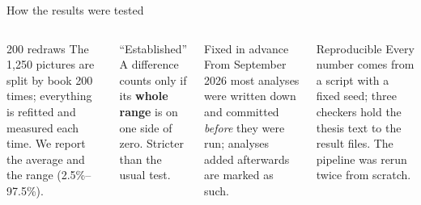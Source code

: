 \documentclass[aspectratio=169,10pt]{beamer}
\begin{document}
\begin{frame}{How the results were tested}
\begin{columns}[T,onlytextwidth]
\begin{defbox}{200 redraws}
The 1,250 pictures are split by book 200 times; everything is refitted and measured each time. We report the average and the range (2.5\%--97.5\%).
\end{defbox}\vspace{3pt}
\begin{defbox}{``Established''}
A difference counts only if its \textbf{whole range} is on one side of zero. Stricter than the usual test.
\end{defbox}
\begin{defbox}{Fixed in advance}
From September 2026 most analyses were written down and committed \emph{before} they were run; analyses added afterwards are marked as such.
\end{defbox}\vspace{3pt}
\begin{defbox}{Reproducible}
Every number comes from a script with a fixed seed; three checkers hold the thesis text to the result files. The pipeline was rerun twice from scratch.
\end{defbox}
\end{columns}
\end{frame}
\end{document}
